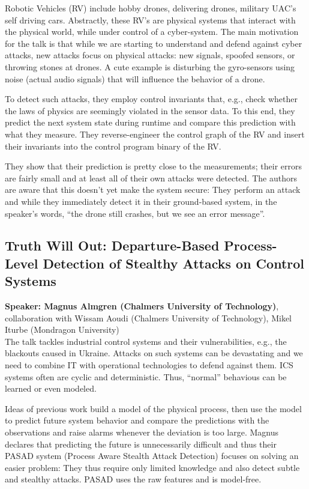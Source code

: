 \documentclass{article}
\begin{document}
Robotic Vehicles (RV) include hobby drones, delivering drones, military UAC's self driving cars. Abstractly, these RV's are physical systems that interact with the physical world, while under control of a cyber-system. The main motivation for the talk is that while we are starting to understand and defend against cyber attacks, new attacks focus on physical attacks: new signals, spoofed sensors, or throwing stones at drones. A cute example is disturbing the gyro-sensors using noise (actual audio signals) that will influence the behavior of a drone.

To detect such attacks, they employ control invariants that, e.g., check whether the laws of physics are seemingly violated in the sensor data. To this end, they predict the next system state during runtime and compare this prediction with what they measure. They reverse-engineer the control graph of the RV and insert their invariants into the control program binary of the RV.

They show that their prediction is pretty close to the measurements; their errors are fairly small and at least all of their own attacks were detected. The authors are aware that this doesn't yet make the system secure: They perform an attack and while they immediately detect it in their ground-based system, in the speaker's words, ``the drone still crashes, but we see an error message''.

\subsection{Truth Will Out: Departure-Based Process-Level Detection of Stealthy Attacks on Control Systems}
\noindent\textbf{Speaker: Magnus Almgren (Chalmers University of Technology)}, collaboration with Wissam Aoudi (Chalmers University of Technology), Mikel Iturbe (Mondragon University)\\

The talk tackles industrial control systems and their vulnerabilities, e.g., the blackouts caused in Ukraine. Attacks on such systems can be devastating and we need to combine IT with operational technologies to defend against them.
ICS systems often are cyclic and deterministic. Thus, ``normal'' behavious can be learned or even modeled. 

Ideas of previous work build a model of the physical process, then use the model to predict future system behavior and compare the predictions with the observations and raise alarms whenever the deviation is too large. Magnus declares that predicting the future is unnecessarily difficult and thus their PASAD system (Process Aware Stealth Attack Detection) focuses on solving an easier problem: They thus require only limited knowledge and also detect subtle and stealthy attacks.
PASAD uses the raw features and is model-free. 
\end{document}
